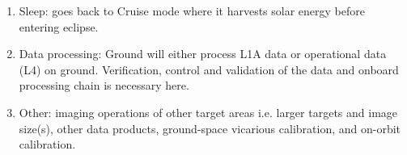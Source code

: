 \begin{enumerate}
\item Sleep: \hypso goes back to Cruise mode where it harvests solar energy before entering eclipse.

\item Data processing: Ground will either process L1A data or operational data (L4) on ground. Verification, control and validation of the data and onboard processing chain is necessary here.
	
\item Other: imaging operations of other target areas i.e. larger targets and image size(s), other data products, ground-space vicarious calibration, and on-orbit calibration.
\end{enumerate}



